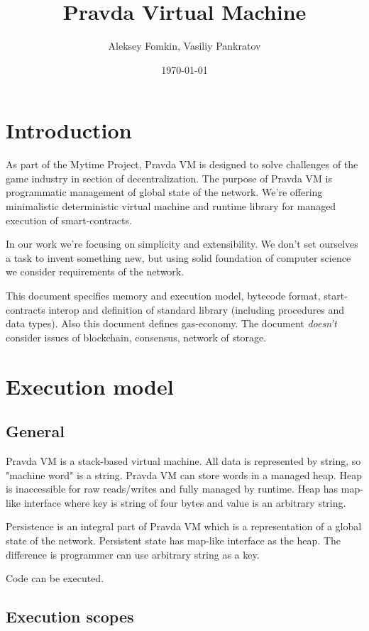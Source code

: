 \documentclass[12pt,a4paper]{article}
\title{Pravda Virtual Machine}
\author{Aleksey Fomkin, Vasiliy Pankratov}
\date{\today}
\begin{document}
\maketitle

\section{Introduction}

As part of the Mytime Project, Pravda VM is designed to solve challenges of the game industry in section of decentralization. The purpose of Pravda VM is programmatic management of global state of the network. We're offering minimalistic deterministic virtual machine and runtime library for managed execution of smart-contracts.

In our work we're focusing on simplicity and extensibility. We don't set ourselves a task to invent something new, but using solid foundation of computer science we consider requirements of the network.

This document specifies memory and execution model, bytecode format, start-contracts interop and definition of standard library (including procedures and data types). Also this document defines gas-economy. The document \textit{doesn't} consider issues of blockchain, consensus, network of storage. 

\section{Execution model}

\subsection{General}

Pravda VM is a stack-based virtual machine. All data is represented by string, so "machine word" is a string. Pravda VM can store words in a managed heap. Heap is inaccessible for raw reads/writes and fully managed by runtime. Heap has map-like interface where key is string of four bytes and value is an arbitrary string. 

Persistence is an integral part of Pravda VM which is a representation of a global state of the network. Persistent state has map-like interface as the heap. The difference is programmer can use arbitrary string as a key.

Code can be executed.
\subsection{Execution scopes}
\end{document}
